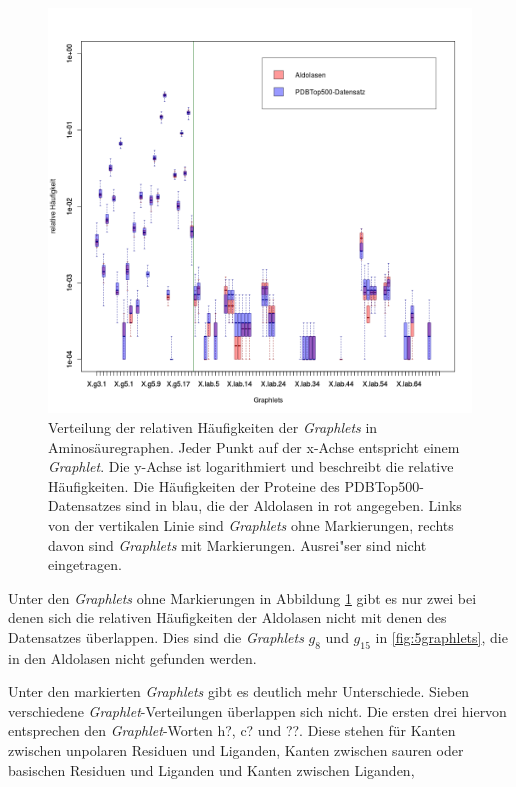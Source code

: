 \documentclass{report}
\begin{document}
\begin{figure}
\label{fig:aaplot}
\includegraphics[scale=0.55]{aa_plot.png}
\caption{Verteilung der relativen H\"aufigkeiten der \textit{Graphlets} in Aminos\"auregraphen. Jeder Punkt auf der x-Achse entspricht einem \textit{Graphlet}. Die y-Achse ist logarithmiert und beschreibt die relative H\"aufigkeiten. Die H\"aufigkeiten der Proteine des PDBTop500-Datensatzes sind in blau, die der Aldolasen in rot angegeben. Links von der vertikalen Linie sind \textit{Graphlets} ohne Markierungen, rechts davon sind \textit{Graphlets} mit Markierungen. Ausrei"ser sind nicht eingetragen.}

\end{figure}




Unter den \textit{Graphlets} ohne Markierungen in Abbildung \ref{fig:aaplot} gibt es nur zwei bei denen sich die relativen H\"aufigkeiten der Aldolasen nicht mit denen des Datensatzes \"uberlappen. Dies sind die \textit{Graphlets} $g_8$ und $g_{15}$ in \ref{fig:5graphlets}, die in den Aldolasen nicht gefunden werden.


Unter den markierten \textit{Graphlets} gibt es deutlich mehr Unterschiede. Sieben verschiedene \textit{Graphlet}-Verteilungen \"uberlappen sich nicht. Die ersten drei hiervon entsprechen den \textit{Graphlet}-Worten h?, c? und ??. Diese stehen f\"ur Kanten zwischen unpolaren Residuen und Liganden, Kanten zwischen sauren oder basischen Residuen und Liganden und Kanten zwischen Liganden,
\end{document}
